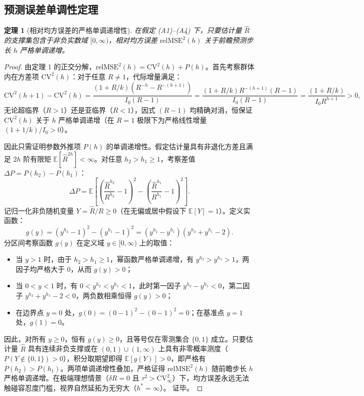 \documentclass[11pt,a4paper]{article}
\theoremstyle{plain}
\newtheorem{theorem}{定理}
\theoremstyle{definition}
\begin{document}
\subsection{预测误差单调性定理}

\begin{theorem}[相对均方误差的严格单调递增性]\label{thm:monotonicity}
在假定 (A1)--(A4) 下，只要估计量 $\hat{R}$ 的支撑集包含于非负实数域 $[0, \infty)$，相对均方误差 $\text{relMSE}^2(h)$ 关于前瞻预测步长 $h$ 严格单调递增。
\end{theorem}

\begin{proof}
由定理 1 的正交分解，$\text{relMSE}^2(h) = \text{CV}^2(h) + P(h)$。首先考察群体内在方差项 $\text{CV}^2(h)$：对于任意 $R \neq 1$，代际增量满足：
\begin{equation}
\text{CV}^2(h+1) - \text{CV}^2(h) = \frac{(1+R/k)(R^{-h} - R^{-(h+1)})}{I_0(R-1)} = \frac{(1+R/k) R^{-(h+1)}(R-1)}{I_0(R-1)} = \frac{(1+R/k)}{I_0 R^{h+1}} > 0,
\end{equation}
无论超临界（$R > 1$）还是亚临界（$R < 1$），因式 $(R-1)$ 均精确对消，恒保证 $\text{CV}^2(h)$ 关于 $h$ 严格单调递增（在 $R=1$ 极限下为严格线性增量 $(1+1/k)/I_0 > 0$）。

因此只需证明参数外推项 $P(h)$ 的单调递增性。假定估计量具有非退化方差且满足 $2h$ 阶有限矩 $\mathbb{E}[\hat{R}^{2h}] < \infty$。对任意 $h_2 > h_1 \ge 1$，考察差值 $\Delta P = P(h_2) - P(h_1)$：
\begin{equation}
\Delta P = \mathbb{E}\left[ \left(\frac{\hat{R}^{h_2}}{R^{h_2}} - 1\right)^2 - \left(\frac{\hat{R}^{h_1}}{R^{h_1}} - 1\right)^2 \right].
\end{equation}
记归一化非负随机变量 $Y = \hat{R}/R \ge 0$（在无偏或居中假设下 $\mathbb{E}[Y] = 1$）。定义实函数：
\begin{equation}
g(y) = (y^{h_2} - 1)^2 - (y^{h_1} - 1)^2 = (y^{h_2} - y^{h_1})(y^{h_2} + y^{h_1} - 2).
\end{equation}
分区间考察函数 $g(y)$ 在定义域 $y \in [0, \infty)$ 上的取值：
\begin{itemize}
\item 当 $y > 1$ 时，由于 $h_2 > h_1 \ge 1$，幂函数严格单调递增，有 $y^{h_2} > y^{h_1} > 1$，两因子均严格大于 0，从而 $g(y) > 0$；
\item 当 $0 < y < 1$ 时，有 $0 < y^{h_2} < y^{h_1} < 1$，此时第一因子 $y^{h_2} - y^{h_1} < 0$，第二因子 $y^{h_2} + y^{h_1} - 2 < 0$，两负数相乘恒得 $g(y) > 0$；
\item 在边界点 $y = 0$ 处，$g(0) = (0-1)^2 - (0-1)^2 = 0$；在基准点 $y = 1$ 处，$g(1) = 0$。
\end{itemize}
因此，对所有 $y \ge 0$，恒有 $g(y) \ge 0$，且等号仅在零测集合 $\{0, 1\}$ 成立。只要估计量 $\hat{R}$ 具有连续非负支撑或在 $(0, 1) \cup (1, \infty)$ 上具有非零概率测度（$P(Y \notin \{0, 1\}) > 0$），积分取期望即得 $\mathbb{E}[g(Y)] > 0$，即严格有 $P(h_2) > P(h_1)$。两项单调递增性叠加，严格证得 $\text{relMSE}^2(h)$ 随前瞻步长 $h$ 严格单调递增。在极端理想情景（$\delta R = 0$ 且 $\tau^2 > \text{CV}^2_\infty$）下，均方误差永远无法触碰容忍度门槛，视界自然延拓为无穷大（$h^* = \infty$）。
证毕。
\end{proof}
\end{document}
